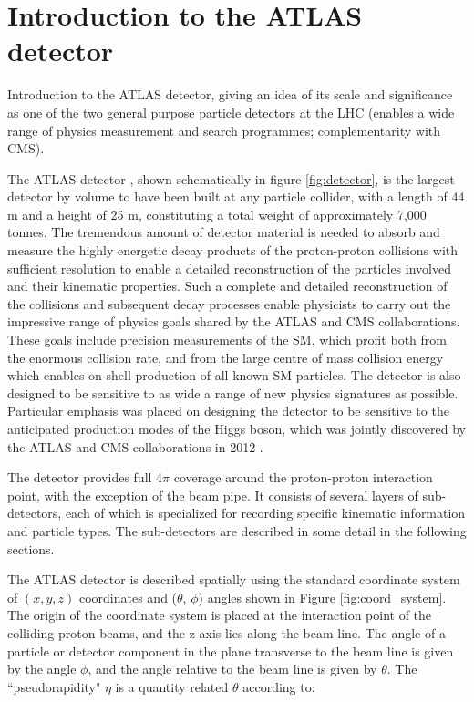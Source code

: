 \section{Introduction to the ATLAS detector}

Introduction to the ATLAS detector, giving an idea of its scale and significance as one of the two general purpose particle detectors at the LHC (enables a wide range of physics measurement and search programmes; complementarity with CMS).

The ATLAS detector \cite{atlas}, shown schematically in figure \ref{fig:detector}, is the largest detector by volume to have been built at any particle collider, with a length of 44 m and a height of 25 m, constituting a total weight of approximately 7,000 tonnes. The tremendous amount of detector material is needed to absorb and measure the highly energetic decay products of the proton-proton collisions with sufficient resolution to enable a detailed reconstruction of the particles involved and their kinematic properties. Such a complete and detailed reconstruction of the collisions and subsequent decay processes enable physicists to carry out the impressive range of physics goals shared by the ATLAS and CMS collaborations. These goals include precision measurements of the SM, which profit both from the enormous collision rate, and from the large centre of mass collision energy which enables on-shell production of all known SM particles. The detector is also designed to be sensitive to as wide a range of new physics signatures as possible. Particular emphasis was placed on designing the detector to be sensitive to the anticipated production modes of the Higgs boson, which was jointly discovered by the ATLAS and CMS collaborations in 2012 \cite{atlas_higgs, cms_higgs}. 

The detector provides full 4$\pi$ coverage around the proton-proton interaction point, with the exception of the beam pipe. It consists of several layers of sub-detectors, each of which is specialized for recording specific kinematic information and particle types. The sub-detectors are described in some detail in the following sections.

The ATLAS detector is described spatially using the standard coordinate system of $(x,y,z)$ coordinates and ($\theta$, $\phi$) angles shown in Figure \ref{fig:coord_system}. The origin of the coordinate system is placed at the interaction point of the colliding proton beams, and the z axis lies along the beam line. The angle of a particle or detector component in the plane transverse to the beam line is given by the angle $\phi$, and the angle relative to the beam line is given by $\theta$. The ``pseudorapidity" $\eta$ is a quantity related $\theta$ according to:

